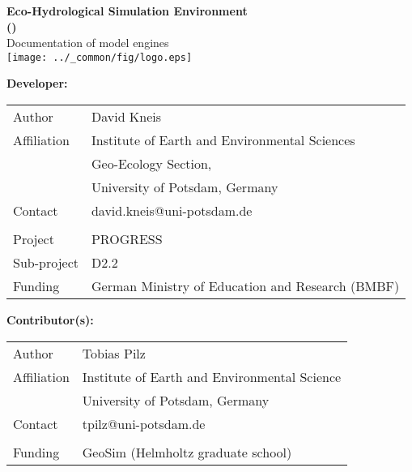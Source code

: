 \documentclass[a4paper,twocolumn,10pt,fleqn]{book}
\begin{document}

\pagestyle{empty}
\onecolumn

\begin{center}
  \vspace*{5cm}
  \LARGE
  \textbf{Eco-Hydrological Simulation Environment \\ ()} \\
  \vspace*{1.2cm}
  Documentation of model engines \\
  \vspace*{2.0cm}
  \texttt{[image: ../\_common/fig/logo.eps]}
\end{center}

\cleardoublepage

\vspace*{4cm}

\textbf{Developer:}\\
\vspace*{2ex}

\begin{tabular}{ll}
Author      & David Kneis \\
Affiliation & Institute of Earth and Environmental Sciences \\
            & Geo-Ecology Section, \\
            & University of Potsdam, Germany \\
Contact     & david.kneis@uni-potsdam.de \\
            & \\
Project     & PROGRESS \\
Sub-project & D2.2 \\
Funding     & German Ministry of Education and Research (BMBF) \\
\end{tabular}

\vspace*{2cm}

\textbf{Contributor(s):}\\
\vspace*{2ex}

\begin{tabular}{ll}
Author      & Tobias Pilz \\
Affiliation & Institute of Earth and Environmental Science \\
            & University of Potsdam, Germany \\
Contact     & tpilz@uni-potsdam.de \\
            & \\
Funding     & GeoSim (Helmholtz graduate school) \\
\end{tabular}
\end{document}

